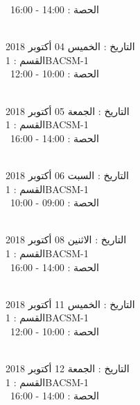 \documentclass[14pt a4paper twocolumn]{book}
\begin{document}
 \  
الحصة : 14:00 - 16:00 \\
\par
\noindent\makebox[\linewidth]{\rule{\paperwidth}{0.4pt}}
 \\
التاريخ : الخميس 04 أكتوبر 2018 \\
القسم : 1BACSM-1 \\
 \  
الحصة : 10:00 - 12:00 \\
\par
\noindent\makebox[\linewidth]{\rule{\paperwidth}{0.4pt}}
 \\
التاريخ : الجمعة 05 أكتوبر 2018 \\
القسم : 1BACSM-1 \\
 \  
الحصة : 14:00 - 16:00 \\
\par
\noindent\makebox[\linewidth]{\rule{\paperwidth}{0.4pt}}
 \\
التاريخ : السبت 06 أكتوبر 2018 \\
القسم : 1BACSM-1 \\
 \  
الحصة : 09:00 - 10:00 \\
\par
\noindent\makebox[\linewidth]{\rule{\paperwidth}{0.4pt}}
 \\
التاريخ : الاثنين 08 أكتوبر 2018 \\
القسم : 1BACSM-1 \\
 \  
الحصة : 14:00 - 16:00 \\
\par
\noindent\makebox[\linewidth]{\rule{\paperwidth}{0.4pt}}
 \\
التاريخ : الخميس 11 أكتوبر 2018 \\
القسم : 1BACSM-1 \\
 \  
الحصة : 10:00 - 12:00 \\
\par
\noindent\makebox[\linewidth]{\rule{\paperwidth}{0.4pt}}
 \\
التاريخ : الجمعة 12 أكتوبر 2018 \\
القسم : 1BACSM-1 \\
 \  
الحصة : 14:00 - 16:00 \\
\par
\noindent\makebox[\linewidth]{\rule{\paperwidth}{0.4pt}}
 \\
\end{document}
